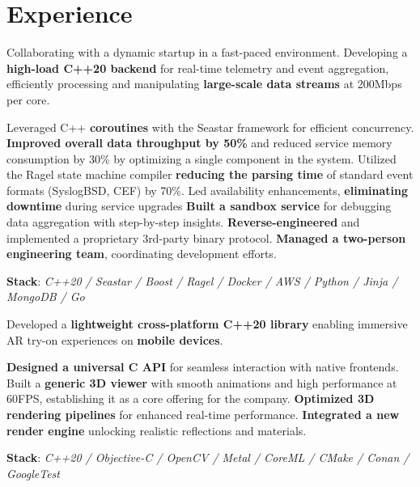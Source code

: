 \documentclass[]{deedy-resume}
\begin{document}
\begin{minipage}[t]{0.70\textwidth}


\section{Experience}


Collaborating with a dynamic startup in a fast-paced environment.
Developing a \textbf{high-load C++20 backend} for real-time telemetry and event aggregation,
efficiently processing and manipulating \textbf{large-scale data streams} at 200Mbps per core.
\begin{descritemize}
    \descritem Leveraged C++ \textbf{coroutines} with the Seastar framework for efficient concurrency.
    \descritem \textbf{Improved overall data throughput by 50\%} and reduced service memory consumption by 30\% by optimizing a single component in the system.
    \descritem Utilized the Ragel state machine compiler \textbf{reducing the parsing time} of standard event formats (SyslogBSD, CEF) by 70\%.
    \descritem Led availability enhancements, \textbf{eliminating downtime} during service upgrades
    \descritem \textbf{Built a sandbox service} for debugging data aggregation with step-by-step insights.
    \descritem \textbf{Reverse-engineered} and implemented a proprietary 3rd-party binary protocol.
    \descritem \textbf{Managed a two-person engineering team}, coordinating development efforts.
\end{descritemize}
\textbf{Stack}: \textit{C++20 / Seastar / Boost / Ragel / Docker / AWS / Python / Jinja / MongoDB / Go}

\sectionspace



Developed a \textbf{lightweight cross-platform C++20 library} enabling immersive AR try-on experiences on \textbf{mobile devices}.
\begin{descritemize}
    \descritem \textbf{Designed a universal C API} for seamless interaction with native frontends.
    \descritem Built a \textbf{generic 3D viewer} with smooth animations and high performance at 60FPS, establishing it as a core offering for the company.
    \descritem \textbf{Optimized 3D rendering pipelines} for enhanced real-time performance.
    \descritem \textbf{Integrated a new render engine} unlocking realistic reflections and materials.
\end{descritemize}
\textbf{Stack}: \textit{C++20 / Objective-C / OpenCV / Metal / CoreML / CMake / Conan / GoogleTest}


\end{minipage}
\end{document}
